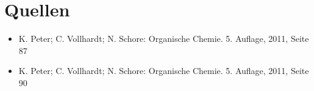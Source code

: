 \section{Quellen}

\begin{itemize}
    \item   K. Peter; C. Vollhardt; N. Schore: Organische Chemie. 5. Auflage, 2011, Seite 87
    \item   K. Peter; C. Vollhardt; N. Schore: Organische Chemie. 5. Auflage, 2011, Seite 90
\end{itemize}
